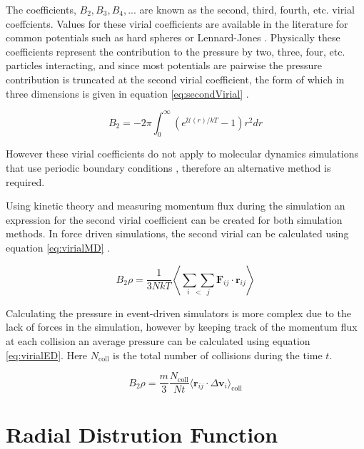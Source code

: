 \documentclass[12pt]{UoAthesis}
\begin{document}
The coefficients, $B_2, B_3, B_4, ...$ are known as the second, third,
fourth, etc. virial coeffcients.  Values for these virial coefficients
are available in the literature for common potentials such as hard
spheres \cite{Labik2005} or Lennard-Jones
\cite{Schultz2009}. Physically these coefficients represent the
contribution to the pressure by two, three, four, etc. particles
interacting, and since most potentials are pairwise the pressure
contribution is truncated at the second virial coefficient, the form
of which in three dimensions is given in equation
\eqref{eq:secondVirial} \cite{Smith2005}.

\begin{equation}
  \label{eq:secondVirial}
  B_2 = -2\pi \int^\infty_0 \left(e^{\mathcal{U}(r)/kT}-1\right)r^2dr
\end{equation}

However these virial coefficients do not apply to molecular dynamics
simulations that use periodic boundary conditions \cite{Haile1997},
therefore an alternative method is required.

Using kinetic theory and measuring momentum flux during the simulation
an expression for the second virial coefficient can be created for
both simulation methods.  In force driven simulations, the second
virial can be calculated using equation \eqref{eq:virialMD}
\cite{Haile1997}.

\begin{equation}
  \label{eq:virialMD}
  B_2\rho = \frac{1}{3NkT}\left \langle\underset{i\;\;<\;\;j}{\sum\sum}\mathbf{F}_{ij}\cdot\mathbf{r}_{ij} \right\rangle
\end{equation}

Calculating the pressure in event-driven simulators is more complex
due to the lack of forces in the simulation, however by keeping track
of the momentum flux at each collision an average pressure can be
calculated using equation \eqref{eq:virialED}\cite{Lue2005}.  Here $N_{\text{coll}}$
is the total number of collisions during the time $t$.

\begin{equation}
  \label{eq:virialED}
  B_2\rho = \frac{m}{3}\frac{N_{\text{coll}}}{Nt}\langle\mathbf{r}_{ij}\cdot\Delta \mathbf{v}_i\rangle_{\text{coll}}
\end{equation}
\section{Radial Distrution Function}
\end{document}
